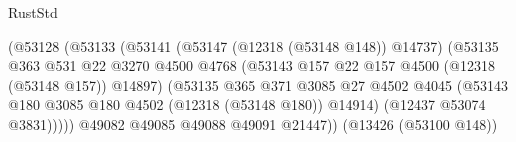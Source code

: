 \begin{lexlean}{RustStd}
\begin{coremodule}
                                                  (@53128
                                                    (@53133
                                                      (@53141
                                                        (@53147 (@12318 (@53148 @148)) @14737)
                                                        (@53135
                                                          @363
                                                          @531
                                                          @22
                                                          @3270
                                                          @4500
                                                          @4768
                                                          (@53143
                                                            @157
                                                            @22
                                                            @157
                                                            @4500
                                                            (@12318 (@53148 @157))
                                                            @14897)
                                                          (@53135
                                                            @365
                                                            @371
                                                            @3085
                                                            @27
                                                            @4502
                                                            @4045
                                                            (@53143
                                                              @180
                                                              @3085
                                                              @180
                                                              @4502
                                                              (@12318 (@53148 @180))
                                                              @14914)
                                                            (@12437 @53074 @3831)))))
                                                    @49082
                                                    @49085
                                                    @49088
                                                    @49091
                                                    @21447))
                                                (@13426 (@53100 @148))

\end{coremodule}
\end{lexlean}
